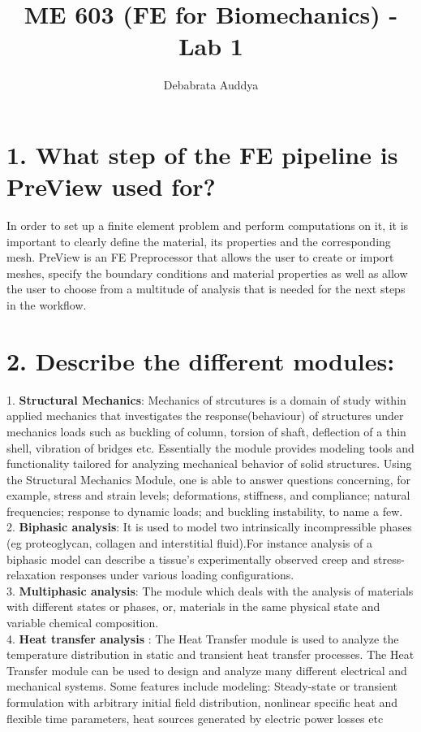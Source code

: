 \documentclass[a4paper,oneside,11pt]{report}
\title{ME 603 (FE for Biomechanics) - Lab 1}
\author{Debabrata Auddya}
\begin{document}
\maketitle
\section*{1. What step of the FE pipeline is PreView used for?}
In order to set up a finite element problem and perform computations on it, it is important to clearly define the material, its properties and the corresponding mesh. PreView is an FE Preprocessor that allows the user to create or import meshes, specify the boundary conditions and material properties as well as allow the user to choose from a multitude of analysis that is needed for the next steps in the workflow.  
\section*{2. Describe the different modules:}
1. \textbf{Structural Mechanics}:
Mechanics of strcutures is a domain of study within applied mechanics that investigates the response(behaviour) of structures under mechanics loads such as buckling of column, torsion of shaft, deflection of a thin shell, vibration of bridges etc. Essentially the module provides modeling tools and functionality tailored for analyzing mechanical behavior of solid structures. Using the Structural Mechanics Module, one is able to answer questions concerning, for example, stress and strain levels; deformations, stiffness, and compliance; natural frequencies; response to dynamic loads; and buckling instability, to name a few.\\
2. \textbf{Biphasic analysis}: It is used to model two intrinsically incompressible phases (eg proteoglycan, collagen and interstitial fluid).For instance analysis of a biphasic model can describe a tissue's experimentally observed creep and stress-relaxation responses under various loading configurations. \\
3. \textbf{Multiphasic analysis}: The module which deals with the analysis of materials with different states or phases, or, materials in the same physical state and variable chemical composition. \\
4. \textbf{Heat transfer analysis} : The Heat Transfer module is used to analyze the temperature distribution in static and transient heat transfer processes. The Heat Transfer module can be used to design and analyze many different electrical and mechanical systems. Some features include modeling: Steady-state or transient formulation with arbitrary initial field distribution, nonlinear specific heat and flexible time parameters, heat sources generated by electric power losses etc\\
\end{document}
